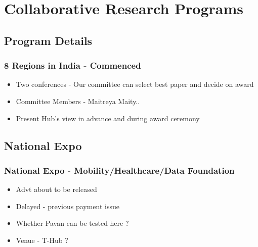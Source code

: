 \section{Collaborative Research Programs}

\subsection{Program Details}
\begin{frame}[fragile=singleslide]{\insertsectionhead}
  \frametitle {8 Regions in India - Commenced}
\begin{center}
\begin{itemize}
\item Two conferences - Our committee can select best paper and decide on award
\item Committee Members - Maitreya Maity..
\item Present Hub's view in advance and during award ceremony
\end{itemize}
\end{center}
\end{frame}


\subsection{National Expo}
\begin{frame}[fragile=singleslide]{\insertsubsectionhead}
  \frametitle {National Expo - Mobility/Healthcare/Data Foundation}
\begin{center}
\begin{itemize}
\item Advt about to be released
\item Delayed - previous payment issue
\item Whether Pavan can be tested here ?
\item Venue - T-Hub ?
\end{itemize}
\end{center}
\end{frame}


